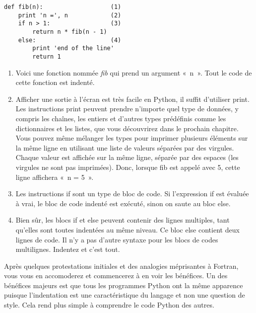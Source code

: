 \begin{example}
\begin{lstlisting}
def fib(n):                   (1)
    print 'n =', n            (2)
    if n > 1:                 (3)
        return n * fib(n - 1)
    else:                     (4)
        print 'end of the line'
        return 1
\end{lstlisting}
\end{example}

\begin{enumerate}
    \item{Voici une fonction nommée \emph{fib} qui prend un argument «~n~». Tout le code de cette fonction est indenté.}
    \item{Afficher une sortie à l'écran est très facile en Python, il suffit d'utiliser print. Les instructions print peuvent prendre n'importe quel type de données, y compris les chaînes, les entiers et d'autres types prédéfinis comme les dictionnaires et les listes, que vous découvrirez dans le prochain chapitre. Vous pouvez même mélanger les types pour imprimer plusieurs éléments sur la même ligne en utilisant une liste de valeurs séparées par des virgules. Chaque valeur est affichée sur la même ligne, séparée par des espaces (les virgules ne sont pas imprimées). Donc, lorsque fib est appelé avec 5, cette ligne affichera «~n = 5~».}
    \item{Les instructions if sont un type de bloc de code. Si l'expression if est évaluée à vrai, le bloc de code indenté est exécuté, sinon on saute au bloc else.}
    \item{Bien sûr, les blocs if et else peuvent contenir des lignes multiples, tant qu'elles sont toutes indentées au même niveau. Ce bloc else contient deux lignes de code. Il n'y a pas d'autre syntaxe pour les blocs de codes multilignes. Indentez et c'est tout.}
\end{enumerate}

\medskip
Après quelques protestations initiales et des analogies méprisantes à Fortran, vous vous en accomoderez et commencerez à en voir les bénéfices. Un des bénéfices majeurs est que tous les programmes Python ont la même apparence puisque l'indentation est une caractéristique du langage et non une question de style. Cela rend plus simple à comprendre le code Python des autres.


